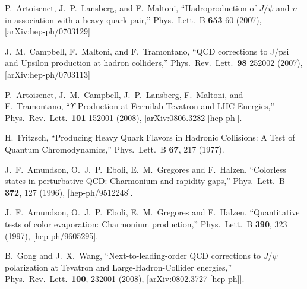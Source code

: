 \documentclass[aps,prc,preprint,superscriptaddress,showpacs,showkeys,amsmath]{revtex4-1}
\begin{document}
\begin{thebibliography}{100}
  P.~Artoisenet, J.~P.~Lansberg, and F.~Maltoni,
  ``Hadroproduction of $J/\psi$ and $\upsilon$ in association with a
  heavy-quark pair,''
  Phys.\ Lett.\  B {\bf 653} 60 (2007),
  [arXiv:hep-ph/0703129]


  J.~M.~Campbell, F.~Maltoni, and F.~Tramontano,
  ``QCD corrections to J/psi and Upsilon production at hadron colliders,''
  Phys.\ Rev.\ Lett.\  {\bf 98} 252002 (2007),
  [arXiv:hep-ph/0703113]


  P.~Artoisenet, J.~M.~Campbell, J.~P.~Lansberg, F.~Maltoni, and F.~Tramontano,
  ``$\Upsilon$ Production at Fermilab Tevatron and LHC Energies,''
  Phys.\ Rev.\ Lett.\  {\bf 101} 152001 (2008),
  [arXiv:0806.3282 [hep-ph]].
  


  H.~Fritzsch,
  ``Producing Heavy Quark Flavors in Hadronic Collisions: A Test of Quantum Chromodynamics,''
  Phys.\ Lett.\ B {\bf 67}, 217 (1977).
  
  J.~F.~Amundson, O.~J.~P.~Eboli, E.~M.~Gregores and F.~Halzen,
  ``Colorless states in perturbative QCD: Charmonium and rapidity gaps,''
  Phys.\ Lett.\ B {\bf 372}, 127 (1996),
  [hep-ph/9512248].


  J.~F.~Amundson, O.~J.~P.~Eboli, E.~M.~Gregores and F.~Halzen,
  ``Quantitative tests of color evaporation: Charmonium production,''
  Phys.\ Lett.\ B {\bf 390}, 323 (1997),
  [hep-ph/9605295].








  B.~Gong and J.~X.~Wang,
  ``Next-to-leading-order QCD corrections to $J/\psi$ polarization at Tevatron and Large-Hadron-Collider energies,''
  Phys.\ Rev.\ Lett.\  {\bf 100}, 232001 (2008),
  [arXiv:0802.3727 [hep-ph]].
  


\end{thebibliography}
\end{document}
